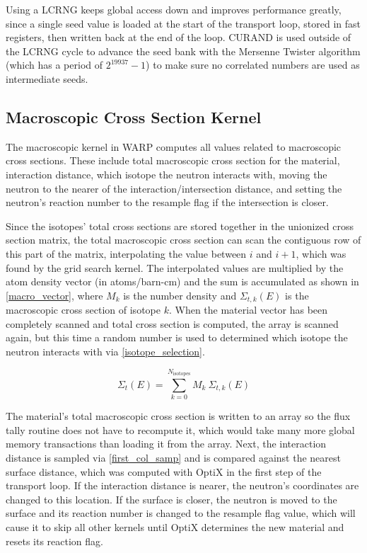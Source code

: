 Using a LCRNG keeps global access down and improves performance greatly, since a single seed value is loaded at the start of the transport loop, stored in fast registers, then written back at the end of the loop.  CURAND is used outside of the LCRNG cycle to advance the seed bank with the Mersenne Twister algorithm (which has a period of $2^{19937} - 1$) to make sure no correlated numbers are used as intermediate seeds.

\subsection{Macroscopic Cross Section Kernel}

The macroscopic kernel in WARP computes all values related to macroscopic cross sections.  These include total macroscopic cross section for the material, interaction distance, which isotope the neutron interacts with, moving the neutron to the nearer of the interaction/intersection distance, and setting the neutron's reaction number to the resample flag if the intersection is closer.  

Since the isotopes' total cross sections are stored together in the unionized cross section matrix, the total macroscopic cross section can scan the contiguous row of this part of the matrix, interpolating the value between $i$ and $i+1$, which was found by the grid search kernel.  The interpolated values are multiplied by the atom density vector (in atoms/barn-cm) and the sum is accumulated as shown in \eqref{macro_vector}, where $M_k$ is the number density and $\Sigma_{t,k}(E)$ is the macroscopic cross section of isotope $k$.  When the material vector has been completely scanned and total cross section is computed, the array is scanned again, but this time a random number is used to determined which isotope the neutron interacts with via \eqref{isotope_selection}.

\begin{equation}
\Sigma_t(E) = \sum_{k=0}^{N_\mathrm{isotopes}} M_k \: \Sigma_{t,k}(E)
\label{macro_vector}
\end{equation}

The material's total macroscopic cross section is written to an array so the flux tally routine does not have to recompute it, which would take many more global memory transactions than loading it from the array. %
 Next, the interaction distance is sampled via \eqref{first_col_samp} and is compared against the nearest surface distance, which was computed with OptiX in the first step of the transport loop.  If the interaction distance is nearer, the neutron's coordinates are changed to this location.  If the surface is closer, the neutron is moved to the surface and its reaction number is changed to the resample flag value, which will cause it to skip all other kernels until OptiX determines the new material and resets its reaction flag.

